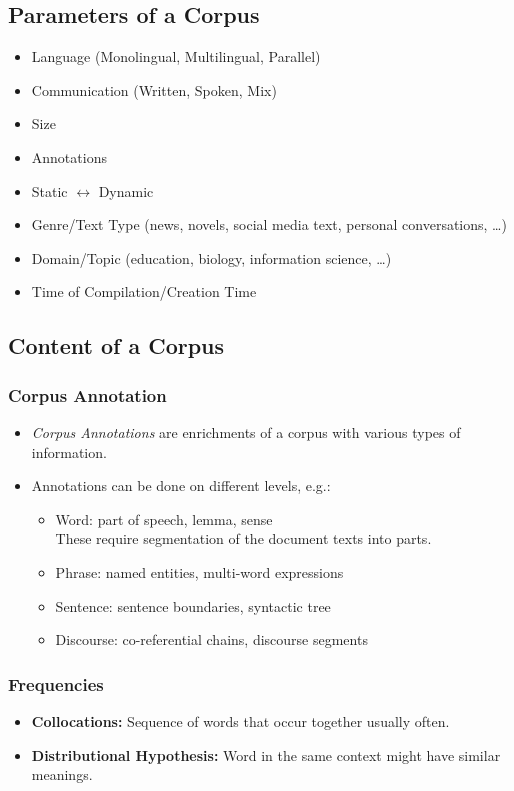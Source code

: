 		\subsection{Parameters of a Corpus} %
			\begin{itemize}
				\item Language (Monolingual, Multilingual, Parallel)
				\item Communication (Written, Spoken, Mix)
				\item Size
				\item Annotations
				\item Static \(\leftrightarrow\) Dynamic
				\item Genre/Text Type (news, novels, social media text, personal conversations, \dots)
				\item Domain/Topic (education, biology, information science, \dots)
				\item Time of Compilation/Creation Time
			\end{itemize}

		\subsection{Content of a Corpus} %
			\subsubsection{Corpus Annotation} %
				\begin{itemize}
					\item \textit{Corpus Annotations} are enrichments of a corpus with various types of information.
					\item Annotations can be done on different levels, e.g.:
						\begin{itemize}
							\item Word: part of speech, lemma, sense \\ These require segmentation of the document texts into parts.
							\item Phrase: named entities, multi-word expressions
							\item Sentence: sentence boundaries, syntactic tree
							\item Discourse: co-referential chains, discourse segments
						\end{itemize}
				\end{itemize}

			\subsubsection{Frequencies} %
				\begin{itemize}
					\item \textbf{Collocations:} Sequence of words that occur together usually often.
					\item \textbf{Distributional Hypothesis:} Word in the same context might have similar meanings.
				\end{itemize}

